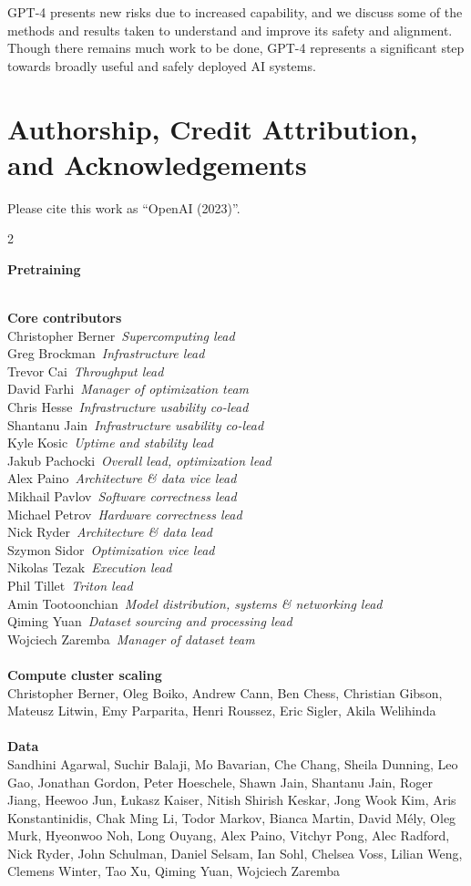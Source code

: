 \documentclass{article}
\newcommand{\creditsectionheader}[1]{\parbox{\columnwidth}{\centering \textbf{\small #1}}\\}
\newcommand{\creditlistheader}[1]{\textbf{#1}\footnotemark[\thefootnote]\\}
\newcommand{\creditlist}[2]{\creditlistheader{#1}#2\\
\\}
\newcommand{\corecontributor}[2]{#1\ \textit{#2}\\}
\begin{document}
GPT-4 presents new risks due to increased capability, and we discuss some of the methods and results taken to understand and improve its safety and alignment. Though there remains much work to be done, GPT-4 represents a significant step towards broadly useful and safely deployed AI systems.

\newpage
\section*{Authorship, Credit Attribution, and Acknowledgements}
Please cite this work as ``OpenAI (2023)''.
      
\begin{multicols}{2}
\scriptsize
{}
\creditsectionheader{Pretraining}
\creditlistheader{Core contributors}
\corecontributor{Christopher Berner}{Supercomputing lead}
\corecontributor{Greg Brockman}{Infrastructure lead}
\corecontributor{Trevor Cai}{Throughput lead}
\corecontributor{David Farhi}{Manager of optimization team}
\corecontributor{Chris Hesse}{Infrastructure usability co-lead}
\corecontributor{Shantanu Jain}{Infrastructure usability co-lead}
\corecontributor{Kyle Kosic}{Uptime and stability lead}
\corecontributor{Jakub Pachocki}{Overall lead, optimization lead}
\corecontributor{Alex Paino}{Architecture \& data vice lead}
\corecontributor{Mikhail Pavlov}{Software correctness lead}
\corecontributor{Michael Petrov}{Hardware correctness lead}
\corecontributor{Nick Ryder}{Architecture \& data lead}
\corecontributor{Szymon Sidor}{Optimization vice lead}
\corecontributor{Nikolas Tezak}{Execution lead}
\corecontributor{Phil Tillet}{Triton lead}
\corecontributor{Amin Tootoonchian}{Model distribution, systems \& networking lead}
\corecontributor{Qiming Yuan}{Dataset sourcing and processing lead}
\corecontributor{Wojciech Zaremba}{Manager of dataset team}
\\
\creditlist{Compute cluster scaling}{Christopher Berner, Oleg Boiko, Andrew Cann, Ben Chess, Christian Gibson, Mateusz Litwin, Emy Parparita, Henri Roussez, Eric Sigler, Akila Welihinda}
\creditlist{Data}{Sandhini Agarwal, Suchir Balaji, Mo Bavarian, Che Chang, Sheila Dunning, Leo Gao, Jonathan Gordon, Peter Hoeschele, Shawn Jain, Shantanu Jain, Roger Jiang, Heewoo Jun, \L{}ukasz Kaiser, Nitish Shirish Keskar, Jong Wook Kim, Aris Konstantinidis, Chak Ming Li, Todor Markov, Bianca Martin, David M\'ely, Oleg Murk, Hyeonwoo Noh, Long Ouyang, Alex Paino, Vitchyr Pong, Alec Radford, Nick Ryder, John Schulman, Daniel Selsam, Ian Sohl, Chelsea Voss, Lilian Weng, Clemens Winter, Tao Xu, Qiming Yuan, Wojciech Zaremba}

\end{multicols}
\end{document}

